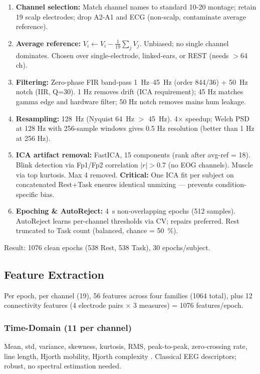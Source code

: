 \documentclass[conference]{IEEEtran}
\begin{document}
\begin{enumerate}
    \item \textbf{Channel selection:} Match channel names to standard 10-20 montage; retain \num{19} scalp electrodes; drop A2-A1 and ECG (non-scalp, contaminate average reference).
    \item \textbf{Average reference:} $V_i \leftarrow V_i - \frac{1}{19}\sum_j V_j$. Unbiased; no single channel dominates. Chosen over single-electrode, linked-ears, or REST (needs $>$64 ch).
    \item \textbf{Filtering:} Zero-phase FIR band-pass \SIrange{1}{45}{\hertz} (order 844/36) + \SI{50}{\hertz} notch (IIR, Q=30). 1 Hz removes drift (ICA requirement); 45 Hz matches gamma edge and hardware filter; 50 Hz notch removes mains hum leakage.
    \item \textbf{Resampling:} \SI{128}{\hertz} (Nyquist \SI{64}{\hertz} $>$ \SI{45}{\hertz}). 4$\times$ speedup; Welch PSD at 128 Hz with 256-sample windows gives 0.5 Hz resolution (better than 1 Hz at 256 Hz).
    \item \textbf{ICA artifact removal:} FastICA, 15 components (rank after avg-ref = 18). Blink detection via Fp1/Fp2 correlation $|r|>0.7$ (no EOG channels). Muscle via top kurtosis. Max 4 removed. \textbf{Critical:} One ICA fit per subject on concatenated Rest+Task ensures identical unmixing — prevents condition-specific bias.
    \item \textbf{Epoching \& AutoReject:} \SI{4}{\second} non-overlapping epochs (512 samples). AutoReject learns per-channel thresholds via CV; repairs preferred. Rest truncated to Task count (balanced, chance = \SI{50}{\%}).
\end{enumerate}

Result: \num{1076} clean epochs (538 Rest, 538 Task), \texttildelow\num{30} epochs/subject.

\subsection{Feature Extraction}
\label{sec:features}
Per epoch, per channel (\num{19}), \num{56} features across four families (\num{1064} total), plus \num{12} connectivity features (\num{4} electrode pairs $\times$ \num{3} measures) = \num{1076} features/epoch.

\subsubsection{Time-Domain (11 per channel)}
Mean, std, variance, skewness, kurtosis, RMS, peak-to-peak, zero-crossing rate, line length, Hjorth mobility, Hjorth complexity \cite{hjorth1970eeg}. Classical EEG descriptors; robust, no spectral estimation needed.
\end{document}
